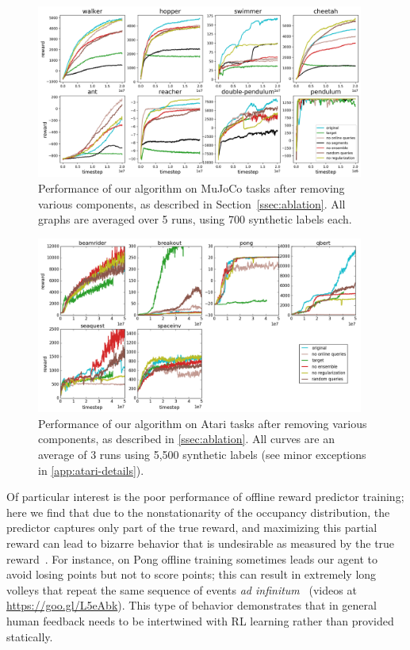 \documentclass{article}
\newif\ifanony  %
\def\plotsize{0.96}  %
\begin{document}
\begin{figure}[t]
\begin{center}
\includegraphics[width=\plotsize\textwidth]{ablation_mujoco_fig.png}
\end{center}
\caption{Performance of our algorithm on MuJoCo tasks after removing various components, as described in Section~\autoref{ssec:ablation}.
All graphs are averaged over 5 runs, using 700 synthetic labels each. 
}
\label{fig:mujoco_ablation}
\end{figure}
\begin{figure}[t]
\begin{center}
\includegraphics[width=\plotsize\textwidth]{ablation_atari_figure.png}
\end{center}
\caption{Performance of our algorithm on Atari tasks after removing various components, 
as described in \autoref{ssec:ablation}.
All curves are an average of 3 runs using 5,500 synthetic labels (see minor exceptions in \autoref{app:atari-details}).}
\label{fig:Atari-ablation}
\end{figure}

Of particular interest is the poor performance of offline reward predictor training;
here we find that due to the nonstationarity of the occupancy distribution,
the predictor captures only part of the true reward,
and maximizing this partial reward can lead to bizarre behavior
that is undesirable as measured by the true reward~\citep{Amodei16}.
For instance, on Pong offline training sometimes leads our agent to avoid losing points but not to score points;
this can result in extremely long volleys that repeat the same sequence of events \emph{ad infinitum}%
~(videos \ifanony in the supplementary material\else at \url{https://goo.gl/L5eAbk}\fi).
This type of behavior demonstrates that in general human feedback
needs to be intertwined with RL learning rather than provided statically.
\end{document}
